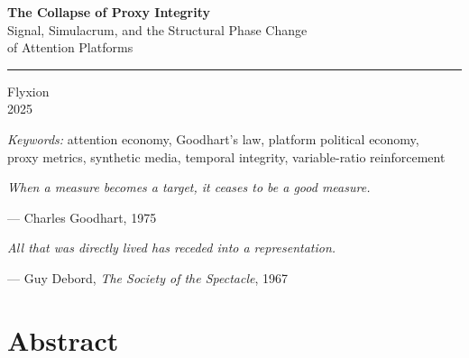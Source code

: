 \documentclass[12pt, a4paper]{article}
\newcommand{\epigraph}[2]{%
  \begin{center}
  \begin{minipage}{0.78\textwidth}
    \small\itshape #1
    \vspace{0.3em}
    \begin{flushright}
      \upshape\footnotesize --- #2
    \end{flushright}
  \end{minipage}
  \end{center}
  \vspace{1em}
}
\begin{document}

\begin{titlepage}
\thispagestyle{empty}
\vspace*{3.5cm}
\begin{flushleft}
{\fontsize{26pt}{32pt}\selectfont\sffamily\bfseries The Collapse of Proxy Integrity}\\[0.6em]
{\fontsize{15pt}{20pt}\selectfont\sffamily\color{rulegray}
Signal, Simulacrum, and the Structural Phase Change\\
of Attention Platforms}
\end{flushleft}
\vspace{2.0cm}
{\color{rulegray}\rule{\linewidth}{0.6pt}}
\vspace{1.0cm}
\begin{flushleft}
{\large\sffamily Flyxion}\\[0.4em]
{\normalsize\sffamily\color{rulegray} 2025}
\end{flushleft}
\vfill
\begin{flushleft}
\small\sffamily\color{rulegray}
\textit{Keywords:} attention economy, Goodhart's law, platform political economy,\\
proxy metrics, synthetic media, temporal integrity, variable-ratio reinforcement
\end{flushleft}
\end{titlepage}

\newpage
\thispagestyle{empty}
\vspace*{2cm}

\epigraph{%
When a measure becomes a target, it ceases to be a good measure.
}{Charles Goodhart, 1975}

\epigraph{%
All that was directly lived has receded into a representation.
}{Guy Debord, \textit{The Society of the Spectacle}, 1967}

\vspace*{\fill}
\newpage

\section*{Abstract}
\thispagestyle{plain}
\end{document}
